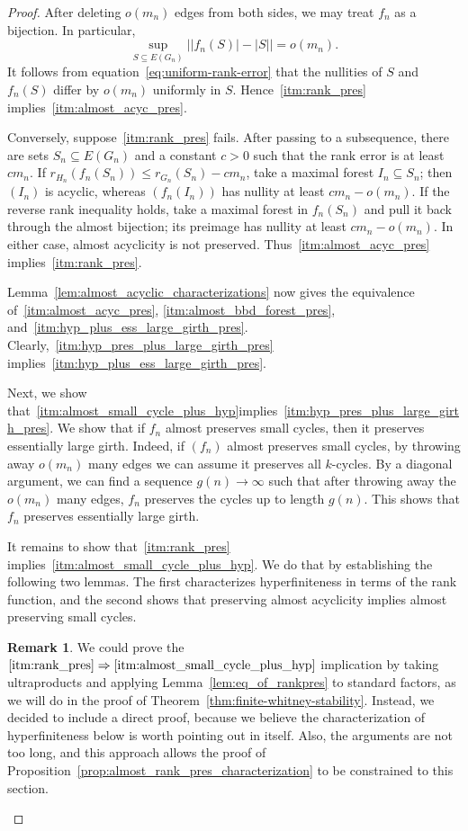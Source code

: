 \documentclass{article}
\theoremstyle{plain}
\theoremstyle{definition}
\newtheorem{rem}[thm]{Remark}
\begin{document}
\begin{proof}

After deleting $o(m_n)$ edges from both sides, we may treat $f_n$ as a bijection. In particular,
\[
    \sup_{S\subseteq E(G_n)}\bigl||f_n(S)|-|S|\bigr|=o(m_n).
\]
It follows from equation~\eqref{eq:uniform-rank-error} that the nullities of $S$ and $f_n(S)$ differ by $o(m_n)$ uniformly in $S$. Hence~\ref{itm:rank_pres} implies~\ref{itm:almost_acyc_pres}.

Conversely, suppose~\ref{itm:rank_pres} fails. After passing to a subsequence, there are sets $S_n\subseteq E(G_n)$ and a constant $c>0$ such that the rank error is at least $cm_n$. If
$r_{H_n}(f_n(S_n))\leq r_{G_n}(S_n)-cm_n$, take a maximal forest $I_n\subseteq S_n$; then $(I_n)$ is acyclic, whereas $(f_n(I_n))$ has nullity at least $cm_n-o(m_n)$. If the reverse rank inequality holds, take a maximal forest in $f_n(S_n)$ and pull it back through the almost bijection; its preimage has nullity at least $cm_n-o(m_n)$. In either case, almost acyclicity is not preserved. Thus~\ref{itm:almost_acyc_pres} implies~\ref{itm:rank_pres}.

Lemma~\ref{lem:almost_acyclic_characterizations} now gives the equivalence of~\ref{itm:almost_acyc_pres}, \ref{itm:almost_bbd_forest_pres}, and~\ref{itm:hyp_plus_ess_large_girth_pres}. Clearly,~\ref{itm:hyp_pres_plus_large_girth_pres} implies~\ref{itm:hyp_plus_ess_large_girth_pres}. 

Next, we show that~\ref{itm:almost_small_cycle_plus_hyp}implies~\ref{itm:hyp_pres_plus_large_girth_pres}. We show that if $f_n$ almost preserves small cycles, then it preserves essentially large girth. Indeed, if $(f_n)$ almost preserves small cycles, by throwing away $o(m_n)$ many edges we can assume it preserves all $k$-cycles. By a diagonal argument, we can find a sequence $g(n)\to\infty$ such that after throwing away the $o(m_n)$ many edges, $f_n$ preserves the cycles up to length $g(n)$. This shows that $f_n$ preserves essentially large girth.

It remains to show that~\ref{itm:rank_pres} implies~\ref{itm:almost_small_cycle_plus_hyp}. We do that by establishing the following two lemmas. The first characterizes hyperfiniteness in terms of the rank function, and the second shows that preserving almost acyclicity implies almost preserving small cycles. 


\begin{rem}
    We could prove the $\ref{itm:rank_pres}\Rightarrow \ref{itm:almost_small_cycle_plus_hyp}$ implication by taking ultraproducts and applying Lemma~\ref{lem:eq_of_rankpres} to standard factors, as we will do in the proof of Theorem~\ref{thm:finite-whitney-stability}. Instead, we decided to include a direct proof, because we believe the characterization of hyperfiniteness below is worth pointing out in itself. Also, the arguments are not too long, and this approach allows the proof of Proposition~\ref{prop:almost_rank_pres_characterization} to be constrained to this section.
\end{rem}


\end{proof}
\end{document}
